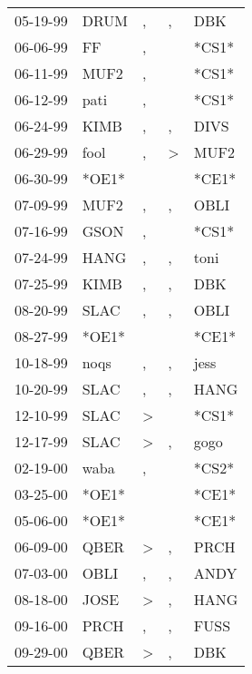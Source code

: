 \begin{supertabular}{lllll}
 05-19-99 &   DRUM &             , &             , &    DBK \\
 06-06-99 &     FF &             , &               &  *CS1* \\
 06-11-99 &   MUF2 &             , &               &  *CS1* \\
 06-12-99 &   pati &             , &               &  *CS1* \\
 06-24-99 &   KIMB &             , &             , &   DIVS \\
 06-29-99 &   fool &             , &  \textgreater &   MUF2 \\
 06-30-99 &  *OE1* &               &               &  *CE1* \\
 07-09-99 &   MUF2 &             , &             , &   OBLI \\
 07-16-99 &   GSON &             , &               &  *CS1* \\
 07-24-99 &   HANG &             , &             , &   toni \\
 07-25-99 &   KIMB &             , &             , &    DBK \\
 08-20-99 &   SLAC &             , &             , &   OBLI \\
 08-27-99 &  *OE1* &               &               &  *CE1* \\
 10-18-99 &   noqs &             , &             , &   jess \\
 10-20-99 &   SLAC &             , &             , &   HANG \\
 12-10-99 &   SLAC &  \textgreater &               &  *CS1* \\
 12-17-99 &   SLAC &  \textgreater &             , &   gogo \\
 02-19-00 &   waba &             , &               &  *CS2* \\
 03-25-00 &  *OE1* &               &               &  *CE1* \\
 05-06-00 &  *OE1* &               &               &  *CE1* \\
 06-09-00 &   QBER &  \textgreater &             , &   PRCH \\
 07-03-00 &   OBLI &             , &             , &   ANDY \\
 08-18-00 &   JOSE &  \textgreater &             , &   HANG \\
 09-16-00 &   PRCH &             , &             , &   FUSS \\
 09-29-00 &   QBER &  \textgreater &             , &    DBK \\

\end{supertabular}
